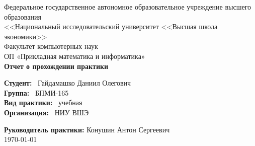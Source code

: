 \documentclass[a4paper, 12pt]{article}
\begin{document}
\begin{titlepage}

\newcommand{\HRule}{\rule{\linewidth}{0.5mm}} %

\center %

{\Large Федеральное государственное автономное образовательное учреждение
	высшего образования}\\[1.0cm]
{\LARGE <<Национальный исследовательский университет 
	<<Высшая школа экономики>>}\\[0.5cm] %

{\Large Факультет компьютерных наук\\
	ОП «Прикладная математика и информатика»}\\[1.5cm] %




{ \huge \bfseries Отчет о прохождении практики}\\ %



\begin{flushleft}
  \large \textbf{Студент:} \
   Гайдамашко Даниил Олегович\\%
   \large \textbf{Группа:} \
   БПМИ-165\\%
   \large \textbf{Вид практики:} \
   учебная\\
    \textbf{Организация:} \
   НИУ ВШЭ\\%
\end{flushleft}

\vfill\vfill\vfill\vfill\vfill

\large \textbf{Руководитель практики:} Конушин Антон Сергеевич \hrulefill\\[2cm]

{\large \today}\\[2cm] %


\vfill %

\end{titlepage}
\end{document}
